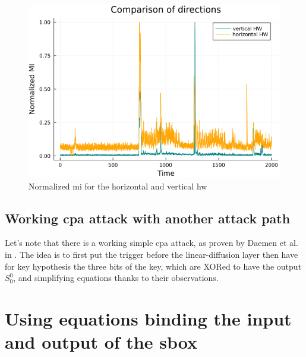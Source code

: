 \documentclass[11pt,technote]{IEEEtran}
\begin{document}
		\begin{figure}[h]
			\centering
			\includegraphics[scale=0.4]{img_files/h_and_v_one_byte}
			\caption{Normalized \ac{mi} for the horizontal and vertical \ac{hw}}
			\label{hvval}
		\end{figure}
		
		\subsection{Working \ac{cpa} attack with another attack path}
		Let's note that there is a working simple \ac{cpa} attack, as proven by Daemen et al. in \cite{cpa_lin}. The idea is to first put the trigger before the linear-diffusion layer then have for key hypothesis the three bits of the key, which are XORed to have the output $S_0^0$, and simplifying equations thanks to their observations.
%		
%		
%		
		
		\section{Using equations binding the input and output of the \ac{sbox}}
\end{document}
